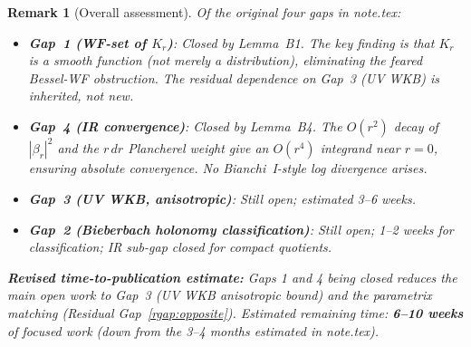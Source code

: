 \documentclass[12pt, a4paper]{article}
\newtheorem{remark}[theorem]{Remark}
\theoremstyle{remark}
\begin{document}
\begin{remark}[Overall assessment]\label{rem:overall}
  Of the original four gaps in note.tex:
  \begin{itemize}
    \item \textbf{Gap~1 (WF-set of $K_r$)}: Closed by Lemma~B1.
      The key finding is that $K_r$ is a smooth \emph{function} (not
      merely a distribution), eliminating the feared Bessel-WF obstruction.
      The residual dependence on Gap~3 (UV WKB) is inherited, not new.
    \item \textbf{Gap~4 (IR convergence)}: Closed by Lemma~B4.
      The $O(r^2)$ decay of $|\beta_r|^2$ and the $r\,dr$ Plancherel
      weight give an $O(r^4)$ integrand near $r=0$, ensuring absolute
      convergence.  No Bianchi~I-style log divergence arises.
    \item \textbf{Gap~3 (UV WKB, anisotropic)}: Still open; estimated 3--6 weeks.
    \item \textbf{Gap~2 (Bieberbach holonomy classification)}: Still open;
      1--2 weeks for classification; IR sub-gap closed for compact quotients.
  \end{itemize}
  \textbf{Revised time-to-publication estimate:}
  Gaps 1 and 4 being closed reduces the main open work to Gap~3
  (UV WKB anisotropic bound) and the parametrix matching (Residual Gap~\ref{rgap:opposite}).
  Estimated remaining time: \textbf{6--10 weeks} of focused work
  (down from the 3--4 months estimated in note.tex).
\end{remark}
\end{document}
